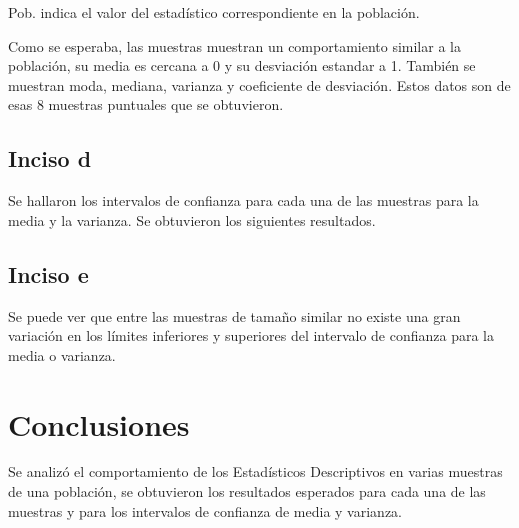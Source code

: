 \documentclass[a4paper,10pt,twocolumn]{article}
\begin{document}
Pob. indica el valor del estadístico correspondiente en la población.

Como se esperaba, las muestras muestran un comportamiento similar a la población, su media es cercana a 0 y su desviación estandar a 1. También se muestran moda, mediana, varianza y coeficiente de desviación. Estos datos son de esas 8 muestras puntuales que se obtuvieron.

\subsection{Inciso d}

Se hallaron los intervalos de confianza para cada una de las muestras para la media y la varianza. Se obtuvieron los siguientes resultados.

\begin{center}
			\centering 
			{
			}
\end{center}

\subsection{Inciso e}

Se puede ver que entre las muestras de tamaño similar no existe una gran variación en los límites inferiores y superiores del intervalo de confianza para la media o varianza.

\section{Conclusiones}

Se analizó el comportamiento de los Estadísticos Descriptivos en varias muestras de una población, se obtuvieron los resultados esperados para cada una de las muestras y para los intervalos de confianza de media y varianza.
\end{document}
